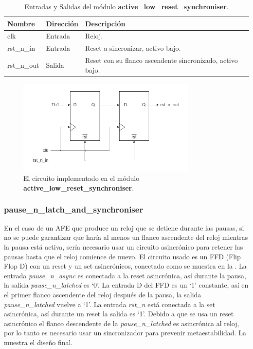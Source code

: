 \documentclass[a4paper, twoside, 11pt]{report}
\begin{document}
\begin{table}[htb]
  \centering
  \tablezebra
  \begin{tabulary}{\linewidth}{l|l|L}
    \setcounter{rownum}{0}
    \textbf{Nombre}&\textbf{Dirección}&\textbf{Descripción} \\
    \hline
    clk&Entrada&Reloj. \\
    rst\_n\_in&Entrada&Reset a sincronizar, activo bajo. \\
    rst\_n\_out&Salida&Reset con su flanco ascendente sincronizado, activo bajo. \\
  \end{tabulary}
  \caption{Entradas y Salidas del módulo \textbf{active\_low\_reset\_synchroniser}.}
  \label{tab:ports_active_low_reset_synchroniser}
\end{table}

\begin{figure}[htb]
  \centering
  \includegraphics[width=0.8\textwidth]{./img/active_low_reset_synchroniser.drawio}
  \caption{El circuito implementado en el módulo \textbf{active\_low\_reset\_synchroniser}.}
  \label{fig:active_low_reset_synchroniser}
\end{figure}

\FloatBarrier
\subsubsection{pause\_n\_latch\_and\_synchroniser}

En el caso de un AFE que produce un reloj que se detiene durante las pausas, si no se puede garantizar que haría al menos un flanco ascendente del reloj mientras la pausa está activa, sería necesario usar un circuito asincrónico para retener las pausas hasta que el reloj comience de nuevo. El circuito usado es un FFD (Flip Flop D) con un reset y un set asincrónicos, conectado como se muestra en la . La entrada \textit{pause\_n\_async} es conectada a la reset asincrónica, así durante la pausa, la salida \textit{pause\_n\_latched} es ‘0’. La entrada D del FFD es un ‘1’ constante, así en el primer flanco ascendente del reloj después de la pausa, la salida \textit{pause\_n\_latched} vuelve a ‘1’. La entrada \textit{rst\_n} está conectada a la set asincrónica, así durante un reset la salida es ‘1’. Debido a que se usa un reset asincrónico el flanco descendente de la  \textit{pause\_n\_latched} es asincrónica al reloj, por lo tanto es necesario usar un sincronizador para prevenir metaestabilidad. La  muestra el diseño final.
\end{document}

